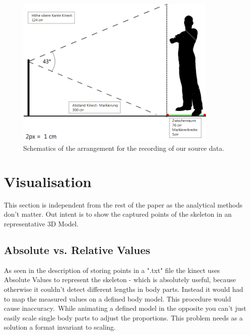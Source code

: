 \documentclass[a4paper]{article}
\begin{document}
\begin{figure}
	\centering
	\includegraphics[width=10cm]{Aufbau.png}
	\caption{Schematics of the arrangement for the recording of our source data.}
	\label{fig:schematic}
\end{figure}

\section{Visualisation}

This section is independent from the rest of the paper as the analytical methods don't matter. Out intent is to show the captured points of the skeleton in an representative 3D Model.

\subsection{Absolute vs. Relative Values}
As seen in the description of storing points in a ".txt" file the kinect uses Absolute Values to represent the skeleton  - which is absolutely useful, because otherwise it couldn't detect different lengths in body parts. Instead it would had to map the measured values on a defined body model. This procedure would cause inaccuracy.\
While animating a defined model in the opposite you can't just easily scale single body parts to adjust the proportions. This problem needs as a solution a format invariant to scaling.
\end{document}
